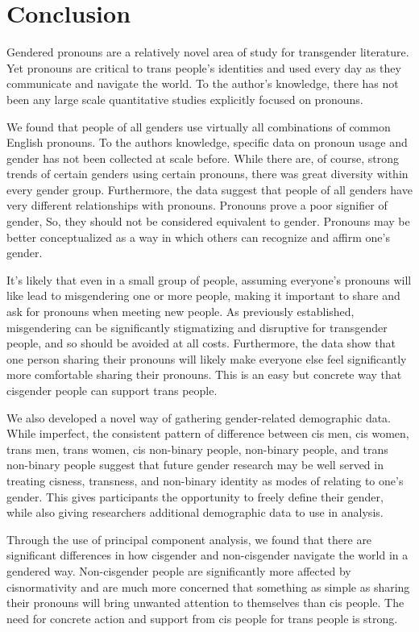 \documentclass[12pt,twoside]{reedthesis}
\begin{document}
\hypertarget{conclusion}{%
\chapter{Conclusion}\label{conclusion}}

Gendered pronouns are a relatively novel area of study for transgender literature. Yet pronouns are critical to trans people's identities and used every day as they communicate and navigate the world. To the author's knowledge, there has not been any large scale quantitative studies explicitly focused on pronouns.

We found that people of all genders use virtually all combinations of common English pronouns. To the authors knowledge, specific data on pronoun usage and gender has not been collected at scale before. While there are, of course, strong trends of certain genders using certain pronouns, there was great diversity within every gender group. Furthermore, the data suggest that people of all genders have very different relationships with pronouns. Pronouns prove a poor signifier of gender, So, they should not be considered equivalent to gender. Pronouns may be better conceptualized as a way in which others can recognize and affirm one's gender.

It's likely that even in a small group of people, assuming everyone's pronouns will like lead to misgendering one or more people, making it important to share and ask for pronouns when meeting new people. As previously established, misgendering can be significantly stigmatizing and disruptive for transgender people, and so should be avoided at all costs. Furthermore, the data show that one person sharing their pronouns will likely make everyone else feel significantly more comfortable sharing their pronouns. This is an easy but concrete way that cisgender people can support trans people.

We also developed a novel way of gathering gender-related demographic data. While imperfect, the consistent pattern of difference between cis men, cis women, trans men, trans women, cis non-binary people, non-binary people, and trans non-binary people suggest that future gender research may be well served in treating cisness, transness, and non-binary identity as modes of relating to one's gender. This gives participants the opportunity to freely define their gender, while also giving researchers additional demographic data to use in analysis.

Through the use of principal component analysis, we found that there are significant differences in how cisgender and non-cisgender navigate the world in a gendered way. Non-cisgender people are significantly more affected by cisnormativity and are much more concerned that something as simple as sharing their pronouns will bring unwanted attention to themselves than cis people. The need for concrete action and support from cis people for trans people is strong.
\end{document}
